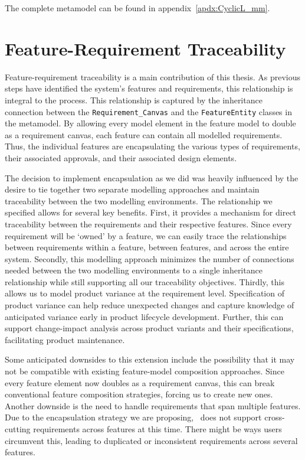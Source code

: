 The complete metamodel can be found in appendix~\ref{apdx:CyclicL_mm}.

\section{Feature-Requirement Traceability}
\label{sec:feat-req_traceability}

Feature-requirement traceability is a main contribution of this thesis. As previous steps have identified the system's features and requirements, this relationship is integral to the process. This relationship is captured by the inheritance connection between the \texttt{Requirement\_Canvas} and the \texttt{FeatureEntity} classes in the metamodel. By allowing every model element in the feature model to double as a requirement canvas, each feature can contain all modelled requirements. Thus, the individual features are encapsulating the various types of requirements, their associated approvals, and their associated design elements. 

The decision to implement encapsulation as we did was heavily influenced by the desire to tie together two separate modelling approaches and maintain traceability between the two modelling environments. The relationship we specified allows for several key benefits. First, it provides a mechanism for direct traceability between the requirements and their respective features. Since every requirement will be `owned' by a feature, we can easily trace the relationships between requirements within a feature, between features, and across the entire system. Secondly, this modelling approach minimizes the number of connections needed between the two modelling environments to a single inheritance relationship while still supporting all our traceability objectives. Thirdly, this allows us to model product variance at the requirement level. Specification of product variance can help reduce unexpected changes and capture knowledge of anticipated variance early in product lifecycle development. Further, this can support change-impact analysis across product variants and their specifications, facilitating product maintenance. 





Some anticipated downsides to this extension include the possibility that it may not be compatible with existing feature-model composition approaches. Since every feature element now doubles as a requirement canvas, this can break conventional feature composition strategies, forcing us to create new ones. Another downside is the need to handle requirements that span multiple features. Due to the encapsulation strategy we are proposing, \tool\ does not support cross-cutting requirements across features at this time. There might be ways users circumvent this, leading to duplicated or inconsistent requirements across several features. 

